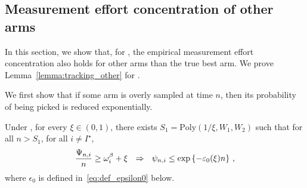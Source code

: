 \subsection{Measurement effort concentration of other arms}\label{app:confidence_ttts.other_arms}

In this section, we show that, for \TTTS, the empirical measurement effort concentration also holds for other arms than the true best arm. We prove Lemma~\ref{lemma:tracking_other} for \TTTS.

We first show that if some arm is overly sampled at time $n$, then its probability of being picked is reduced exponentially.

\begin{lemma}\label{lemma:over_allocation_finite_ttts} 
    Under \TTTS, for every $\xi \in (0,1)$, there exists $S_1 = \text{Poly}(1/\xi,W_1,W_2)$ such that for all $n > S_1$, for all $i\neq I^\star$, 
    \[
        \frac{\Psi_{n,i}}{n} \geq \omega_{i}^\beta + \xi  \ \ \Rightarrow \ \ \psi_{n,i} \leq \exp\left\{-\varepsilon_0(\xi) n\right\}\,,
    \]
    where $\epsilon_0$ is defined in~\eqref{eq:def_epsilon0} below.
\end{lemma}

